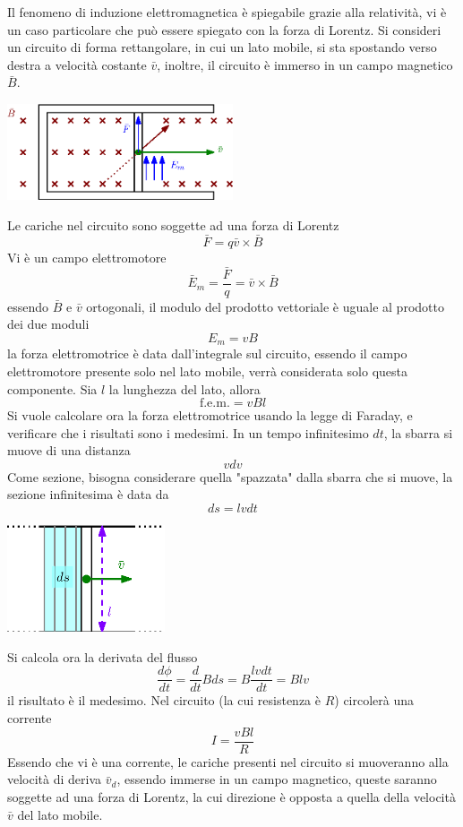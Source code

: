 \documentclass[10pt, letterpaper]{report}
\begin{document}
Il fenomeno di induzione elettromagnetica è spiegabile grazie alla relatività, vi è un  caso particolare che può essere spiegato con la forza di Lorentz.\acc 
Si consideri un circuito di forma rettangolare, in cui un lato mobile, si sta spostando verso destra a velocità costante $\bar v$, inoltre, il circuito è immerso in un campo magnetico $\bar B$.
\begin{center}
    \includegraphics[width=0.5\textwidth ]{images/sbarra1.eps}
\end{center}
Le cariche nel circuito sono soggette ad una forza di Lorentz $$ \bar F = q\bar v \times \bar B  $$
Vi è un campo elettromotore 
$$ \bar E_m=\frac{\bar F}{q}=\bar v \times \bar B$$
essendo $\bar B$ e $\bar v$ ortogonali, il modulo del prodotto vettoriale è uguale al prodotto dei due moduli 
$$ E_m=vB$$
la forza elettromotrice è data dall'integrale sul circuito, essendo il campo elettromotore presente solo nel lato mobile, verrà considerata solo questa componente. Sia $l$ la lunghezza del lato, allora 
$$ \text{f.e.m.}=vBl$$
Si vuole calcolare ora la forza elettromotrice usando la legge di Faraday, e verificare che i risultati sono i medesimi. In un tempo infinitesimo $dt$, la sbarra si muove di una distanza $$ vdv$$
Come sezione, bisogna considerare quella "spazzata" dalla sbarra che si muove, la sezione infinitesima è data da 
$$ ds=lvdt$$
\begin{center}
    \includegraphics[width=0.35\textwidth ]{images/sbarra2.eps}
\end{center}
Si calcola ora la derivata del flusso
$$ \frac{d\phi}{dt}=\frac{d}{dt}Bds=B\frac{lvdt}{dt}=Blv$$
il risultato è il medesimo. Nel circuito (la cui resistenza è $R$) circolerà una corrente 
$$ I=\frac{vBl}{R}$$
Essendo che vi è una corrente, le cariche presenti nel circuito si muoveranno alla velocità di deriva $\bar v_d$, essendo immerse in un campo magnetico, queste saranno soggette ad una forza di Lorentz, la cui direzione è opposta a quella della velocità $\bar v$ del lato mobile.\acc 
\end{document}

